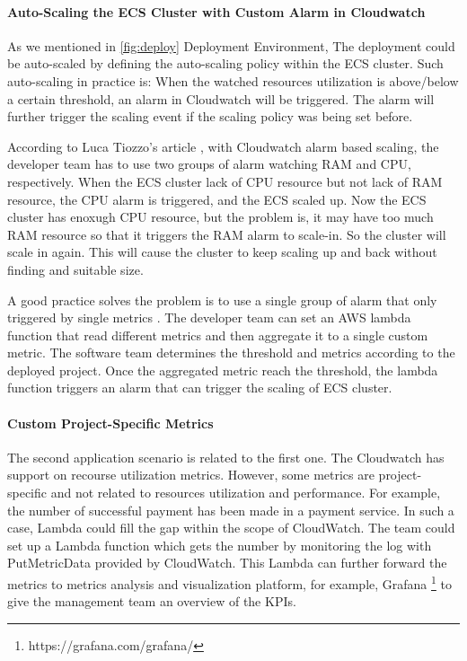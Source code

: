 \paragraph[]{Auto-Scaling the ECS Cluster with Custom Alarm in Cloudwatch}
As we mentioned in \ref{fig:deploy} Deployment Environment, The deployment could be auto-scaled by defining the auto-scaling policy within the ECS cluster. Such auto-scaling in practice is: When the watched resources utilization is above/below a certain threshold, an alarm in Cloudwatch will be triggered. The alarm will further trigger the scaling event if the scaling policy was being set before.
\par
According to Luca Tiozzo's article \cite{AWSECSho47:online}, with Cloudwatch alarm based scaling, the developer team has to use two groups of alarm watching RAM and CPU, respectively. When the ECS cluster lack of CPU resource but not lack of RAM resource, the CPU alarm is triggered, and the ECS scaled up. Now the ECS cluster has enoxugh CPU resource, but the problem is, it may have too much RAM resource so that it triggers the RAM alarm to scale-in. So the cluster will scale in again. This will cause the cluster to keep scaling up and back without finding and suitable size.
\par
A good practice solves the problem is to use a single group of alarm that only triggered by single metrics \cite{AWSECSho47:online}. The developer team can set an AWS lambda function that read different metrics and then aggregate it to a single custom metric. The software team determines the threshold and metrics according to the deployed project. Once the aggregated metric reach the threshold, the lambda function triggers an alarm that can trigger the scaling of ECS cluster. 
\paragraph[]{Custom Project-Specific Metrics}
The second application scenario is related to the first one. The Cloudwatch has support on recourse utilization metrics. However, some metrics are project-specific and not related to resources utilization and performance. For example, the number of successful payment has been made in a payment service. In such a case, Lambda could fill the gap within the scope of CloudWatch. The team could set up a Lambda function which gets the number by monitoring the log with PutMetricData provided by CloudWatch. This Lambda can further forward the metrics to metrics analysis and visualization platform, for example, Grafana \footnote{https://grafana.com/grafana/} to give the management team an overview of the KPIs.
